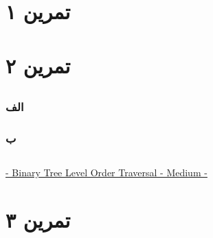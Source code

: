 \documentclass[]{article}
\begin{document}
\section*{تمرین ۱}


\subsection*{\color{blue}{جواب}}


\subsection*{\color{red}{مراجع}}
\begin{latin}
\end{latin}

\pagebreak
{}
\section*{تمرین ۲}


\subsection*{\color{blue}{جواب}}
\subsubsection*{الف}

\subsubsection*{ب}


\subsection*{\color{red}{مراجع}}
\begin{latin}
\href{https://medium.com/swlh/binary-tree-level-order-traversal-a12df61a85d0}{ - Binary Tree Level Order Traversal - Medium -}
\end{latin}
\restoregeometry

\pagebreak
\section*{تمرین ۳}

\subsection*{\color{blue}{جواب}}
\end{document}
